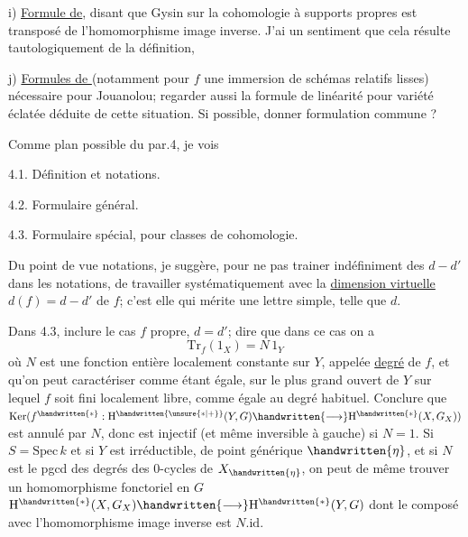  i) \uline{Formule de}, disant que Gysin  sur la cohomologie à supports propres est transposé de l'homomorphisme image inverse. J'ai un sentiment que cela résulte tautologiquement de la définition, 

 j) \uline{Formules de } (notamment pour $f$ une immersion de schémas relatifs lisses)\handwritten{,} nécessaire pour Jouanolou; regarder aussi la formule de linéarité pour variété éclatée déduite de cette situation. Si possible, donner formulation commune ?

Comme plan possible du par.4, je vois

4.1. Définition et notations.

4.2. Formulaire général.

4.3. Formulaire spécial, pour classes de cohomologie.

Du point de vue notations, je suggère, pour ne pas trainer indéfiniment des $d-d'$ dans les notations, de travailler systématiquement avec la \uline{dimension virtuelle} $d(f)=d-d'$ de $f$; c'est elle qui mérite une lettre simple, telle que $d$.

Dans 4.3, inclure le cas $f$ propre, $d=d'$; dire que dans ce  cas on a
\[
\mathrm{Tr}_f(1_X)=N\,1_Y
\]
où $N$ est une fonction entière localement constante sur $Y$, appelée \uline{degré} de $f$, et qu'on peut caractériser comme étant égale, sur  le plus grand ouvert de $Y$ sur lequel $f$ soit fini localement libre, comme égale au degré habituel. Conclure que $\mathrm{Ker}(f^{\handwritten{*}}:\mathrm{H}^{\handwritten{\unsure{*|+}}}(Y,G)\handwritten{\longrightarrow}\mathrm{H}^{\handwritten{*}}(X,G_X))$ est annulé par $N$, donc est injectif (et même inversible à gauche) si $N=1$. \handwritten{[}Si $S=\mathrm{Spec}\,k$ et si $Y$ est irréductible, de point générique $\handwritten{\eta}$, et si $N$ est le pgcd des degrés des $0$-cycles de $X_{\handwritten{\eta}}$\inserted{\handwritten{$\neq\varnothing$}}, on peut de même trouver un homomorphisme\handwritten{,} fonctoriel en $G$\handwritten{\unsure{$\leftarrow$}}\handwritten{,} $\mathrm{H}^{\handwritten{*}}(X,G_X)\handwritten{\longrightarrow}\mathrm{H}^{\handwritten{*}}(Y,G)$ dont le composé avec l'homomorphisme image inverse est $N.\mathrm{id}$.\handwritten{]}
